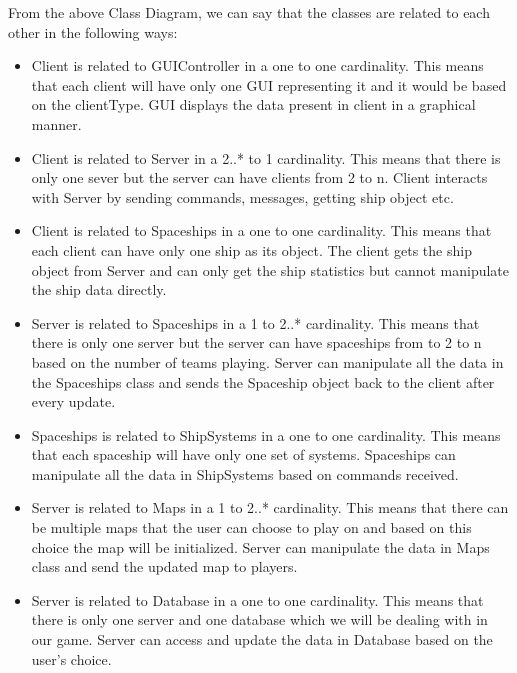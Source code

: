 From the above Class Diagram, we can say that the classes are related to each other in the following ways:

\begin{itemize}
\item Client is related to GUIController in a one to one cardinality. This means that each client will have only one GUI representing it and it would be based on the clientType. GUI displays the data present in client in a graphical manner.
\item Client is related to Server in a 2..* to 1 cardinality. This means that there is only one sever but the server can have clients from 2 to n. Client interacts with Server by sending commands, messages, getting ship object etc.
\item Client is related to Spaceships in a one to one cardinality. This means that each client can have only one ship as its object. The client gets the ship object from Server and can only get the ship statistics but cannot manipulate the ship data directly.
\item Server is related to Spaceships in a 1 to 2..* cardinality. This means that there is only one server but the server can have spaceships from to 2 to n based on the number of teams playing. Server can manipulate all the data in the Spaceships class and sends the Spaceship object back to the client after every update.
\item Spaceships is related to ShipSystems in a one to one cardinality. This means that each spaceship will have only one set of systems. Spaceships can manipulate all the data in ShipSystems based on commands received.
\item Server is related to Maps in a 1 to 2..* cardinality. This means that there can be multiple maps that the user can choose to play on and based on this choice the map will be initialized. Server can manipulate the data in Maps class and send the updated map to players.
\item Server is related to Database in a one to one cardinality. This means that there is only one server and one database which we will be dealing with in our game. Server can access and update the data in Database based on the user's choice.
\end{itemize}